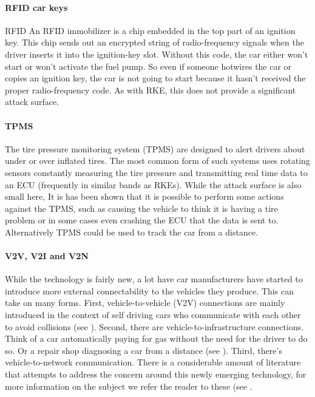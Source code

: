 \documentclass[11pt]{article}
\begin{document}
\paragraph{RFID car keys} RFID An RFID immobilizer is a chip embedded in the top part of an ignition key. This chip sends out an encrypted string of radio-frequency signals when the driver inserts it into the ignition-key slot. Without this code, the car either won't start or won't activate the fuel pump. So even if someone hotwires the car or copies an ignition key, the car is not going to start because it hasn't received the proper radio-frequency code\cite{RFID}. As with RKE, this does not provide a significant attack surface.

\paragraph{TPMS} The tire pressure monitoring system (TPMS) are designed to alert drivers about under or over inflated tires. The most common form of such systems uses rotating sensors constantly measuring the tire pressure and transmitting real time data to an ECU (frequently in similar bands as RKEs)\cite{Kosher}. While the attack surface is also small here, It is has been shown that it is possible to perform some actions against the TPMS, such as causing the vehicle to think it is having a tire problem\cite{TPMS} or in some cases even crashing the ECU that the data is sent to\cite{MillerA}. Alternatively TPMS could be used to track the car from a distance\cite{TPMS}.

\paragraph{V2V, V2I and V2N} While the technology is fairly new, a lot have car manufacturers have started to introduce more external connectability to the vehicles they produce. This can take on many forms\cite{Ahmed}. First, vehicle-to-vehicle (V2V) connections are mainly introduced in the context of self driving cars who communicate with each other to avoid collisions (see \cite{Enisa}). Second, there are vehicle-to-infrastructure connections. Think of a car automatically paying for gas without the need for the driver to do so. Or a repair shop diagnosing a car from a distance (see \cite{Kleberger}). Third, there's vehicle-to-network communication. There is a considerable amount of literature that attempts to address the concern around this newly emerging technology, for more information on the subject we refer the reader to these (see \cite{Kleberger15}\cite{Russel17}\cite{Maxim}\cite{Crispo}.
\end{document}
